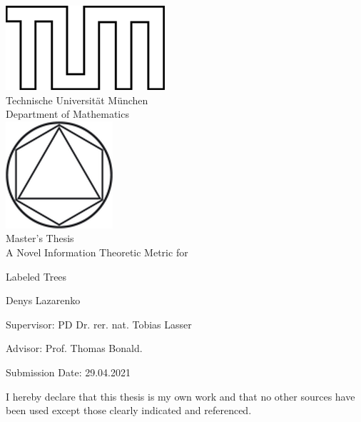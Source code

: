 \documentclass[IN, 11pt, twoside, openright, master, english]{tumthesis}
\begin{document}
\pagestyle{empty}
	\begin{titlepage}
		\begin{center}
			\includegraphics{figures/TUMlschwarz.png}\\[3mm]
			\sf
			{\Large
				Technische Universit\"at M\"unchen\\[5mm]
				Department of Mathematics\\[8mm]
			}
			\normalsize
			\includegraphics{figures/TUMlMschwarz.png}\\[15mm]
			
			Master's Thesis\\[15mm]
			
			{\Huge
				A Novel Information Theoretic Metric for
			}
			
			\vspace{0.1cm}
			
			{\Huge
				Labeled Trees
			}
		
			\bigskip
			
			\normalsize
			
			Denys Lazarenko
		\end{center}
		\vspace*{55mm}
		
		Supervisor: PD Dr. rer. nat. Tobias Lasser
		\medskip
		
		Advisor: Prof. Thomas Bonald.
		\medskip
		
		Submission Date: 29.04.2021
		\medskip
	\end{titlepage}

\vspace*{150mm}

I hereby declare that this thesis is my own work and that no other sources have been used except those clearly indicated and referenced.
\bigskip
\end{document}
